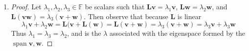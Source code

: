 \documentclass[12pt]{amsart}
\newcommand{\la}{\lambda}
\begin{document}
\begin{enumerate}[label=\arabic*.]
\vspace{2.5em}

	\item 
\begin{proof}
	Let \(\la_1,\la_2,\la_3\in\mathbb{F}\) 
	be scalars such that
	\(\mathbf{L}\mathbf{v} = \la_1\mathbf{v}\),
	\(\mathbf{L}\mathbf{w} = \la_2\mathbf{w}\), and
	\(\mathbf{L}(\mathbf{v}\mathbf{w}) = \la_3(\mathbf{v}+\mathbf{w})\).
	Then observe that because \(\mathbf{L}\) is linear 
	\[
	\la_1\mathbf{v} + \la_2\mathbf{w} 
	= \mathbf{L}(\mathbf{v} + \mathbf{L}(\mathbf{w}) 
	= \mathbf{L}(\mathbf{v}+\mathbf{w}) 
	= \la_3(\mathbf{v}+\mathbf{w})
	= \la_3\mathbf{v}+\la_3\mathbf{w}
	\]
	Thus \(\la_1=\la_3=\la_2\), and is the \(\la\) associated with the eigenspace formed by the \(\operatorname{span}{\mathbf{v},\mathbf{w}}\).
\end{proof}
\end{enumerate}
\end{document}
